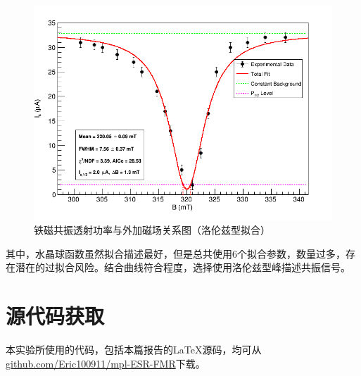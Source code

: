 \documentclass{thuemp}
\begin{document}
    \begin{figure}[H]
        \centering
        \includegraphics[width=0.9\linewidth]{../Data/FMR_ConstantBg_LorentzPeak.png}
        \caption{铁磁共振透射功率与外加磁场关系图（洛伦兹型拟合）} \label{fig:FMR_Lorentz}
    \end{figure}
    
    其中，水晶球函数虽然拟合描述最好，但是总共使用6个拟合参数，数量过多，存在潜在的过拟合风险。结合曲线符合程度，选择使用洛伦兹型峰描述共振信号。
    
    
    
    \section{源代码获取}
    
    本实验所使用的代码，包括本篇报告的\LaTeX 源码，均可从\url{github.com/Eric100911/mpl-ESR-FMR}下载。
    
    
\end{document}
